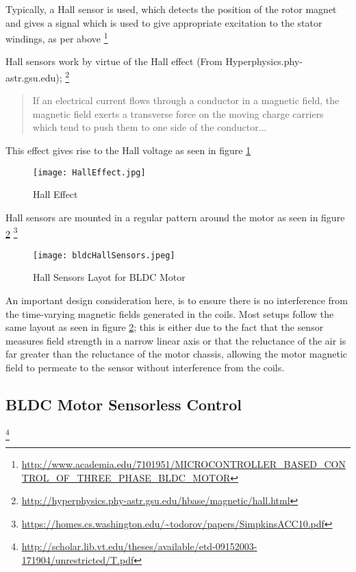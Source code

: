 \documentclass[a4paper]{article}
\begin{document}
    Typically, a Hall sensor is used, which detects the position of the rotor
    magnet and gives a signal which is used to give appropriate excitation to
    the stator windings, as per above
        \footnote{\url{http://www.academia.edu/7101951/MICROCONTROLLER_BASED_CONTROL_OF_THREE_PHASE_BLDC_MOTOR}}

    Hall sensors work by virtue of the Hall effect (From
    Hyperphysics.phy-astr.gsu.edu);
        \footnote{\url{http://hyperphysics.phy-astr.gsu.edu/hbase/magnetic/hall.html}}
    \begin{quote}
        If an electrical current flows through a conductor in a magnetic field,
        the magnetic field exerts a transverse force on the moving charge
        carriers which tend to push them to one side of the conductor...
    \end{quote}

    This effect gives rise to the Hall voltage as seen in figure \ref{HallEffect}
    \begin{figure}
        \centering
        \texttt{[image: HallEffect.jpg]}
        \caption{\label{HallEffect}Hall Effect}
    \end{figure}

    Hall sensors are mounted in a regular pattern around the motor as seen
    in figure \ref{BLDC:Sensor:Hall}
        \footnote{\url{https://homes.cs.washington.edu/~todorov/papers/SimpkinsACC10.pdf}}

    \begin{figure}
        \centering
        \texttt{[image: bldcHallSensors.jpeg]}
        \caption{\label{BLDC:Sensor:Hall}Hall Sensors Layot for BLDC Motor}
    \end{figure}

    An important design consideration here, is to ensure there is no
    interference from the time-varying magnetic fields generated in the coils.
    Most setups follow the same layout as seen in figure \ref{BLDC:Sensor:Hall};
    this is either due to the fact that the sensor measures field strength in a
    narrow linear axis or that the reluctance of the air is far greater than the
    reluctance of the motor chassis, allowing the motor magnetic field to
    permeate to the sensor without interference from the coils.

\subsection{BLDC Motor Sensorless Control}
\footnote{\url{http://scholar.lib.vt.edu/theses/available/etd-09152003-171904/unrestricted/T.pdf}}
\end{document}
